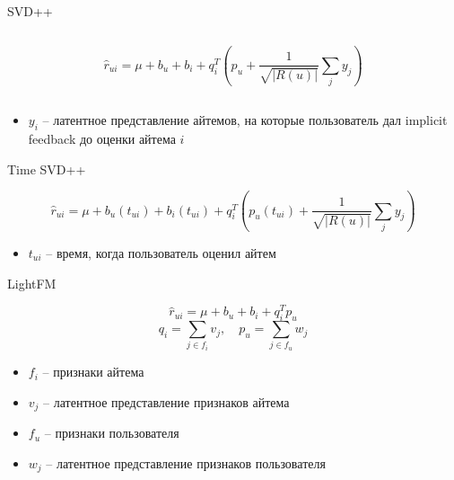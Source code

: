 \documentclass[11pt,aspectratio=169]{beamer}
\begin{document}
\begin{frame}{SVD++}

\begin{columns}
\begin{column}{0.1\textwidth} 
\end{column}
\begin{column}{0.7\textwidth} 
\begin{tcolorbox}[colback=info!5,colframe=info!80,title=Модель]
\[
\hat r_{ui} = \mu + b_u + b_i + q_i^T \left( p_u + \frac{1}{\sqrt{|R(u)|}} \sum_j y_j \right)
\]
\end{tcolorbox}
\end{column}
\begin{column}{0.1\textwidth} 
\end{column}
\end{columns}

\vfill

\begin{itemize}
\item $y_i$ -- латентное представление айтемов, на которые пользователь дал implicit feedback до оценки айтема $i$
\end{itemize}

\end{frame}

\begin{frame}{Time SVD++}

\begin{tcolorbox}[colback=info!5,colframe=info!80,title=Модель]
\[
\hat r_{ui} = \mu + b_u(t_{ui}) + b_i(t_{ui}) + q_i^T \left( p_u(t_{ui}) + \frac{1}{\sqrt{|R(u)|}} \sum_j y_j \right)
\]
\end{tcolorbox}

\vfill

\begin{itemize}
\item $t_{ui}$ -- время, когда пользователь оценил айтем
\end{itemize}

\end{frame}

\begin{frame}{LightFM \cite{LIGHT}}

\begin{tcolorbox}[colback=info!5,colframe=info!80,title=Модель]
\[
\hat r_{ui} = \mu + b_u + b_i + q_i^T p_u
\]
\[
q_i = \sum_{j \in f_i} v_j, \quad p_u = \sum_{j \in f_u} w_j
\]
\end{tcolorbox}

\vfill

\begin{itemize}
\item $f_i$ -- признаки айтема
\item $v_j$ -- латентное представление признаков айтема
\item $f_u$ -- признаки пользователя
\item $w_j$ -- латентное представление признаков пользователя
\end{itemize}

\end{frame}
\end{document}
